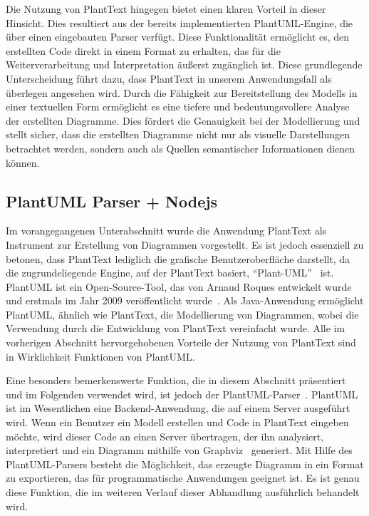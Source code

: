 Die Nutzung von PlantText hingegen bietet einen klaren Vorteil in dieser Hinsicht. Dies resultiert aus der bereits
implementierten PlantUML-Engine, die über einen eingebauten Parser verfügt. Diese Funktionalität ermöglicht es,
den erstellten Code direkt in einem Format zu erhalten, das für die Weiterverarbeitung und Interpretation äußerst zugänglich ist.
Diese grundlegende Unterscheidung führt dazu, dass PlantText in unserem Anwendungsfall als überlegen angesehen wird.
Durch die Fähigkeit zur Bereitstellung des Modells in einer textuellen Form ermöglicht es eine tiefere und
bedeutungsvollere Analyse der erstellten Diagramme. Dies fördert die Genauigkeit bei der Modellierung und stellt sicher,
dass die erstellten Diagramme nicht nur als visuelle Darstellungen betrachtet werden, sondern auch als Quellen
semantischer Informationen dienen können.

\subsection{PlantUML Parser + Nodejs}

Im vorangegangenen Unterabschnitt wurde die Anwendung PlantText als Instrument zur Erstellung von Diagrammen
vorgestellt. Es ist jedoch essenziell zu betonen, dass PlantText lediglich die grafische Benutzeroberfläche darstellt,
da die zugrundeliegende Engine, auf der PlantText basiert, ``Plant-UML''~\cite{plantUML} ist. PlantUML ist ein Open-Source-Tool,
das von Arnaud Roques entwickelt wurde und erstmals im Jahr 2009 veröffentlicht wurde~\cite{plantUML}. Als Java-Anwendung
ermöglicht PlantUML, ähnlich wie PlantText, die Modellierung von Diagrammen, wobei die Verwendung durch die Entwicklung
von PlantText vereinfacht wurde. Alle im vorherigen Abschnitt hervorgehobenen Vorteile der Nutzung von PlantText sind in
Wirklichkeit Funktionen von PlantUML.

Eine besonders bemerkenswerte Funktion, die in diesem Abschnitt präsentiert und im Folgenden verwendet wird, ist jedoch
der PlantUML-Parser~\cite{plantUMLParser}. PlantUML ist im Wesentlichen eine Backend-Anwendung, die auf einem Server
ausgeführt wird. Wenn ein Benutzer ein Modell erstellen und Code in PlantText eingeben möchte, wird dieser Code an einen Server
übertragen, der ihn analysiert, interpretiert und ein Diagramm mithilfe von Graphviz~\cite{graphViz} generiert. Mit
Hilfe des PlantUML-Parsers besteht die Möglichkeit, das erzeugte Diagramm in ein Format zu exportieren, das für
programmatische Anwendungen geeignet ist. Es ist genau diese Funktion, die im weiteren Verlauf dieser Abhandlung
ausführlich behandelt wird.

